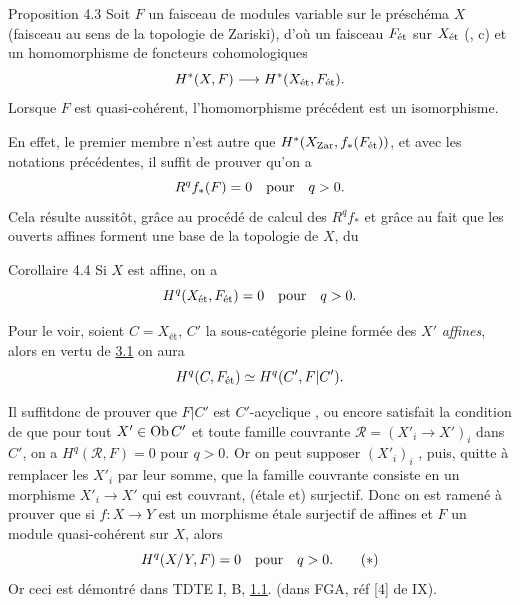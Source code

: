 \documentclass[10pt]{../fichiers-configuration-latex/smfart}
\begin{document}
\begin{enonce*}{Proposition 4.3}
Soit $F$ un faisceau de modules variable sur le préschéma $X$
(faisceau au sens de la topologie de Zariski), d'où un faisceau
$F_{\text{\rm ét}}$ sur $X_{\text{\rm ét}}$ (, c) et un
homomorphisme de foncteurs cohomologiques
$$
H^{\ast} (X, F) \to H^{\ast} (X_{\text{\rm ét}}, F_{\text{\rm ét}}){\quoi}.
$$
Lorsque $F$ est quasi-cohérent, l'homomorphisme précédent est un isomorphisme.
\end{enonce*}

En effet, le premier membre n'est autre que $H^{\ast} (X_{\operatorname{Zar}},
f_{\ast} (F_{\text{ét}}))$, et avec les notations précédentes, il
suffit de prouver qu'on a
$$
R^q f_{\ast} (F) = 0\quad \mbox{pour}\quad q > 0{}.
$$
Cela résulte aussitôt, grâce au procédé de calcul des $R^q f_{\ast}$
et grâce au fait que les ouverts affines forment une base de la
topologie de $X$, du

\begin{enonce*}{Corollaire 4.4}
Si $X$ est affine, on a
$$
H^{q} (X_{\text{\rm ét}}, F_{\text{\rm ét}}) = 0\quad \mbox{pour}\quad q > 0{}.
$$
\end{enonce*}

Pour le voir, soient $C = X_{\text{ét}}$, $C'$ la sous-catégorie pleine
formée des $X'$ \emph{affines}, alors en vertu de \hyperref[VII.prop3.1]{3.1} on aura
$$
H^{q} (C, F_{\text{ét}}) \simeq H^{q} (C', F | C'){}.
$$

Il suffit\pageoriginale donc de prouver que $F | C'$ est
$C'$-acyclique , ou encore satisfait la condition de
 \ie que pour tout $X'\in \operatorname{Ob} C'$ et toute famille
couvrante $ℛ = (X'_{i} \to X')_i$ dans $C'$, on a $H^{q}
(ℛ, F) = 0$ pour $q > 0$. Or on peut supposer $(X'_{i})_{i}$
, puis, quitte à remplacer les $X'_{i}$ par leur somme, que la
famille couvrante consiste en un morphisme $X'_{i} \to X'$ qui est
couvrant, \ie (étale et) surjectif. Donc on est ramené à prouver que
si $f : X \to Y$ est un morphisme étale surjectif de  affines
et $F$ un module quasi-cohérent sur $X$, alors
\begin{equation*}
H^q (X /Y, F) = 0\quad \mbox{pour}\quad q > 0{}.\tag{$\ast$}
\end{equation*}
Or ceci est démontré dans TDTE I, B, \hyperref[VII.subsec1.1]{1.1}. (dans FGA, \cf réf [4] de
IX).
\end{document}

